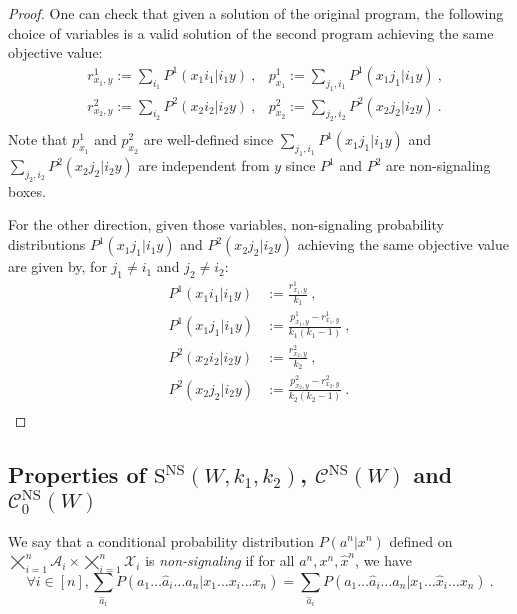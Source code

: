 \begin{proof}
  One can check that given a solution of the original program, the following choice of variables is a valid solution of the second program achieving the same objective value:
\begin{equation}
  \begin{aligned}
    &r^1_{x_1,y} := \sum_{i_1} P^1(x_1i_1|i_1y) \ , &p^1_{x_1} := \sum_{j_1,i_1} P^1(x_1j_1|i_1y) \ ,\\
    &r^2_{x_2,y} := \sum_{i_2} P^2(x_2i_2|i_2y) \ , &p^2_{x_2} := \sum_{j_2,i_2} P^2(x_2j_2|i_2y) \ .\\
  \end{aligned}
\end{equation}
Note that $p^1_{x_1}$ and $p^2_{x_2}$ are well-defined since  $\sum_{j_1,i_1} P^1(x_1j_1|i_1y)$ and $\sum_{j_2,i_2} P^2(x_2j_2|i_2y)$ are independent from $y$ since $P^1$ and $P^2$ are non-signaling boxes.

For the other direction, given those variables, non-signaling probability distributions $P^1(x_1j_1|i_1y)$ and $P^2(x_2j_2|i_2y)$ achieving the same objective value are given by, for $j_1 \not=i_1$ and $j_2 \not= i_2$:
\begin{equation}
  \begin{aligned}
    P^1(x_1i_1|i_1y) &:= \frac{r^1_{x_1,y}}{k_1} \ ,\\
    P^1(x_1j_1|i_1y) &:= \frac{p^1_{x_1,y} - r^1_{x_1,y}}{k_1(k_1-1)} \ ,\\
    P^2(x_2i_2|i_2y) &:= \frac{r^2_{x_2,y}}{k_2} \ ,\\
    P^2(x_2j_2|i_2y) &:= \frac{p^2_{x_2,y} - r^2_{x_2,y}}{k_2(k_2-1)} \ .\\
  \end{aligned}
\end{equation}
\end{proof}

\subsection{Properties of $\mathrm{S}^{\mathrm{NS}}(W,k_1,k_2)$, $\mathcal{C}^{\mathrm{NS}}(W)$ and $\mathcal{C}^{\mathrm{NS}}_0(W)$}
\begin{definition}
  We say that a conditional probability distribution $P(a^n|x^n)$ defined on $\bigtimes_{i=1}^n\mathcal{A}_i \times \bigtimes_{i=1}^n \mathcal{X}_i$ is \emph{non-signaling} if for all $a^n, x^n, \hat{x}^n$, we have
    \[ \forall i \in [n], \sum_{\hat{a}_i}P(a_1\ldots \hat{a}_i \ldots a_n|x_1\ldots x_i \ldots x_n) = \sum_{\hat{a}_i}P(a_1\ldots \hat{a}_i \ldots a_n|x_1\ldots \hat{x}_i \ldots x_n) \ .\]
\end{definition}

